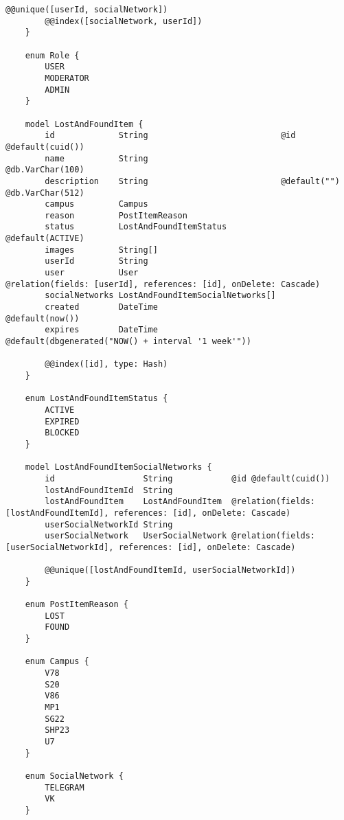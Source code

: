 \begin{lstlisting}[label=lst:factorial]
		@@unique([userId, socialNetwork])
		@@index([socialNetwork, userId])
	}
	
	enum Role {
		USER
		MODERATOR
		ADMIN
	}
	
	model LostAndFoundItem {
		id             String                           @id @default(cuid())
		name           String                           @db.VarChar(100)
		description    String                           @default("") @db.VarChar(512)
		campus         Campus
		reason         PostItemReason
		status         LostAndFoundItemStatus           @default(ACTIVE)
		images         String[]
		userId         String
		user           User                             @relation(fields: [userId], references: [id], onDelete: Cascade)
		socialNetworks LostAndFoundItemSocialNetworks[]
		created        DateTime                         @default(now())
		expires        DateTime                         @default(dbgenerated("NOW() + interval '1 week'"))
		
		@@index([id], type: Hash)
	}
	
	enum LostAndFoundItemStatus {
		ACTIVE
		EXPIRED
		BLOCKED
	}
	
	model LostAndFoundItemSocialNetworks {
		id                  String            @id @default(cuid())
		lostAndFoundItemId  String
		lostAndFoundItem    LostAndFoundItem  @relation(fields: [lostAndFoundItemId], references: [id], onDelete: Cascade)
		userSocialNetworkId String
		userSocialNetwork   UserSocialNetwork @relation(fields: [userSocialNetworkId], references: [id], onDelete: Cascade)
		
		@@unique([lostAndFoundItemId, userSocialNetworkId])
	}
	
	enum PostItemReason {
		LOST
		FOUND
	}
	
	enum Campus {
		V78
		S20
		V86
		MP1
		SG22
		SHP23
		U7
	}
	
	enum SocialNetwork {
		TELEGRAM
		VK
	}
\end{lstlisting}